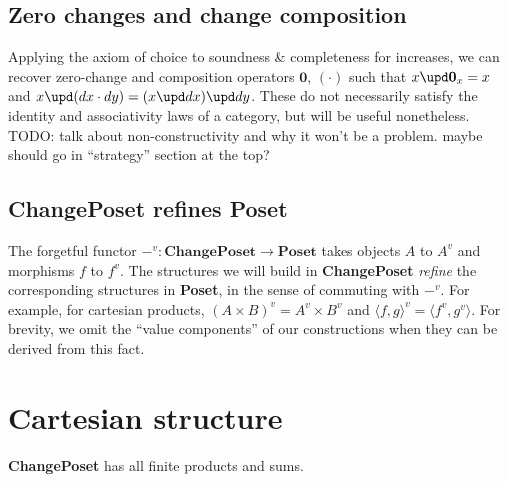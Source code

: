 \documentclass{rntz}
\newcommand\todo[1]{{\color{Rhodamine}#1}}
\newcommand\cat\textbf
\newcommand\CP{\cat{ChangePoset}}
\newcommand\Poset{\cat{Poset}}
\newcommand\x\times
\newcommand\zero{\ensuremath{\mathbold{0}}}
\newcommand\vals[1]{#1^v} %
\newcommand\valfn{\ensuremath{\vals{-}}}
\newcommand\funct[1]{\vals{#1}}
\newcommand\fork[1]{\langle{#1}\rangle}
\begin{document}

\subsection{Zero changes and change composition}

Applying the axiom of choice to soundness \& completeness for increases, we can
recover zero-change and composition operators $\zero$, $(\cdot)$ such that $x
\upd \zero_x = x$ and $x \upd (dx \cdot dy) = (x \upd dx) \upd dy$. These do not
necessarily satisfy the identity and associativity laws of a category, but will
be useful nonetheless. \todo{TODO: talk about non-constructivity and why it
  won't be a problem. maybe should go in ``strategy'' section at the top?}


\subsection{\CP{} refines \Poset{}}
\label{sec:refines}

The forgetful functor $\valfn : \CP \to \Poset$ takes objects $A$ to $\vals{A}$
and morphisms $f$ to $\funct f$. The structures we will build in \CP{}
\emph{refine} the corresponding structures in \Poset{}, in the sense of
commuting with $\valfn$. For example, for cartesian products, $\vals{(A \x B)} =
\vals{A} \x \vals{B}$ and $\funct{\fork{f,g}} = \fork{\funct f, \funct g}$. For
brevity, we omit the ``value components'' of our constructions when they can be
derived from this fact.


\section{Cartesian structure}

\begin{theorem}
  \CP{} has all finite products and sums.
\end{theorem}
\end{document}
